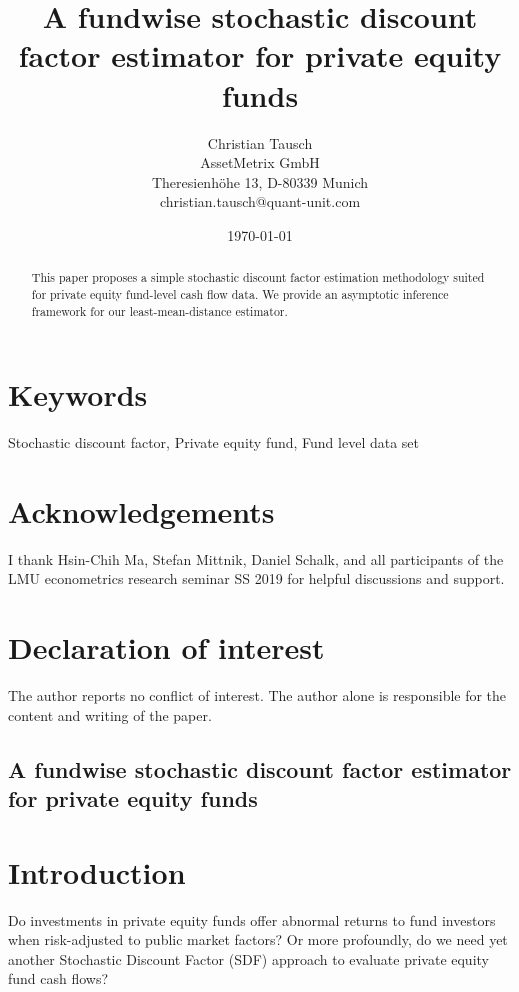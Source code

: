 \documentclass[12pt]{article}
\title{A fundwise stochastic discount factor estimator for private equity funds}
\author{
	Christian Tausch  \\
	AssetMetrix GmbH  \\
	Theresienh\"{o}he 13, D-80339 Munich \\
	christian.tausch@quant-unit.com \\
	}
\date{\today}
\begin{document}
\maketitle


\section*{Keywords}
Stochastic discount factor, Private equity fund, Fund level data set


\section*{Acknowledgements}
I thank Hsin-Chih Ma, Stefan Mittnik, Daniel Schalk, and all participants of the LMU econometrics research seminar SS 2019 for helpful discussions and support.


\section*{Declaration of interest}
The author reports no conflict of interest. 
The author alone is responsible for the content and writing of the paper.


\newpage

\begin{center} 
\section*{A fundwise stochastic discount factor estimator for private equity funds}
\end{center}



\begin{abstract}
This paper proposes a simple stochastic discount factor estimation methodology suited for private equity fund-level cash flow data.
We provide an asymptotic inference framework for our least-mean-distance estimator.
\end{abstract}

\section{Introduction}
Do investments in private equity funds offer abnormal returns to fund investors when risk-adjusted to public market factors?
Or more profoundly, do we need yet another Stochastic Discount Factor (SDF) approach to evaluate private equity fund cash flows?
\end{document}
